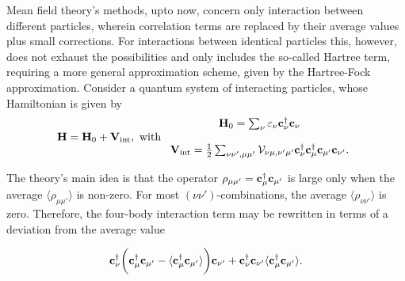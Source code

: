 \documentclass{homework}
\begin{document}
Mean field theory's methods, upto now, concern only interaction between different particles, wherein correlation terms are replaced by their average values plus small corrections. For interactions between identical particles this, however, does not exhaust the possibilities and only includes the so-called Hartree term, requiring a more general approximation scheme, given by the Hartree-Fock approximation. Consider a quantum system of interacting particles, whose Hamiltonian is given by 
\begin{equation}
    {\bf H} = {\bf H}_0 + {\bf V}_{\textnormal{int}}, \textnormal{ with } \begin{array}{c}
         {\bf H}_0 = \sum_{\nu} \varepsilon_{\nu} {\bf c}_{\nu}^\dagger {\bf c}_{\nu}\\
         \\
         {\bf V}_{\textnormal{int}}  = \frac{1}{2} \sum_{\nu\nu', \mu\mu'} {\mathcal V}_{\nu\mu, \nu'\mu'} {\bf c}_{\nu}^\dagger {\bf c}_{\mu}^\dagger {\bf c}_{\mu'} {\bf c}_{\nu'}.\\
    \end{array}
\end{equation}

The theory's main idea is that the operator $\rho_{\mu \mu'} = {\bf c}_{\mu}^\dagger {\bf c}_{\mu'}$ is large only when the average $\langle \rho_{\mu \mu'} \rangle$ is non-zero. For most $(\nu \nu')$-combinations, the average $\langle \rho_{\nu \nu'} \rangle$ is zero. Therefore, the four-body interaction term may be rewritten in terms of a deviation from the average value

$$
    {\bf c}_{\nu}^\dagger \bigg({\bf c}_{\mu}^\dagger {\bf c}_{\mu'} - \langle {\bf c}_{\mu}^\dagger {\bf c}_{\mu'} \rangle \bigg) {\bf c}_{\nu'} + {\bf c}_{\nu}^\dagger {\bf c}_{\nu'} \langle {\bf c}_{\mu}^\dagger {\bf c}_{\mu'}\rangle.
$$
\end{document}
